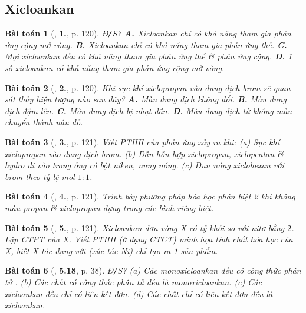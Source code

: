 \documentclass{article}
\numberwithin{equation}{section}
\newtheorem{baitoan}{Bài toán}[section]
\begin{document}

\subsection{Xicloankan}

\begin{baitoan}[\cite{SGK_Hoa_Hoc_11_co_ban}, \textbf{1.}, p. 120]
	\emph{Đ\texttt{/}S}? {\bf A.} Xicloankan chỉ có khả năng tham gia phản ứng cộng mở vòng. {\bf B.} Xicloankan chỉ có khả năng tham gia phản ứng thế. {\bf C.} Mọi xicloankan đều có khả năng tham gia phản ứng thế \& phản ứng cộng. {\bf D.} 1 số xicloankan có khả năng tham gia phản ứng cộng mở vòng.
\end{baitoan}

\begin{baitoan}[\cite{SGK_Hoa_Hoc_11_co_ban}, \textbf{2.}, p. 120]
	Khi sục khí xiclopropan vào dung dịch brom sẽ quan sát thấy hiện tượng nào sau đây? {\bf A.} Màu dung dịch không đổi. {\bf B.} Màu dung dịch đậm lên. {\bf C.} Màu dung dịch bị nhạt dần. {\bf D.} Màu dung dịch từ không màu chuyển thành nâu đỏ.
\end{baitoan}

\begin{baitoan}[\cite{SGK_Hoa_Hoc_11_co_ban}, \textbf{3.}, p. 121]
	Viết PTHH của phản ứng xảy ra khi: (a) Sục khí xiclopropan vào dung dịch brom. (b) Dẫn hỗn hợp xiclopropan, xiclopentan \& hydro đi vào trong ống có bột niken, nung nóng. (c) Đun nóng xiclohexan với brom theo tỷ lệ mol $1:1$.
\end{baitoan}

\begin{baitoan}[\cite{SGK_Hoa_Hoc_11_co_ban}, \textbf{4.}, p. 121]
	Trình bày phương pháp hóa học phân biệt 2 khí không màu propan \& xiclopropan đựng trong các bình riêng biệt.
\end{baitoan}

\begin{baitoan}[\cite{SGK_Hoa_Hoc_11_co_ban}, \textbf{5.}, p. 121]
	Xicloankan đơn vòng X có tỷ khối so với nitơ bằng $2$. Lập CTPT của X. Viết PTHH (ở dạng CTCT) minh họa tính chất hóa học của X, biết X tác dụng với \emph{} (xúc tác \emph{Ni}) chỉ tạo ra 1 sản phẩm.
\end{baitoan}

\begin{baitoan}[\cite{SBT_Hoa_Hoc_11_co_ban}, \textbf{5.18}, p. 38]
	\emph{Đ\texttt{/}S?} (a) Các monoxicloankan đều có công thức phân tử \emph{}. (b) Các chất có công thức phân tử \emph{} đều là monoxicloankan. (c) Các xicloankan đều chỉ có liên kết đơn. (d) Các chất chỉ có liên kết đơn đều là xicloankan.
\end{baitoan}
\end{document}
